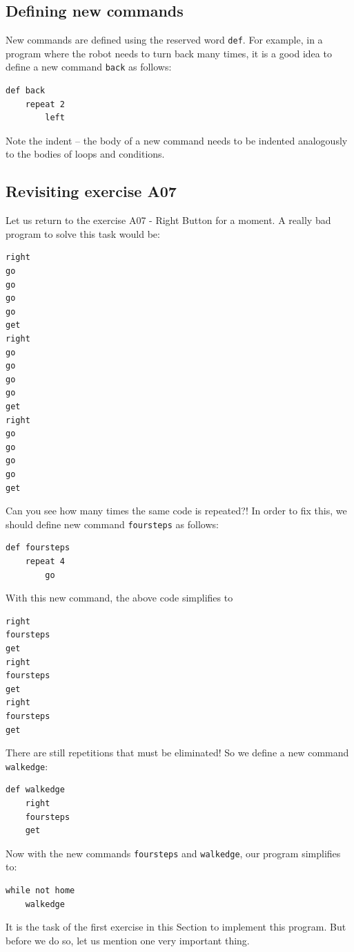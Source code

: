 \subsection{Defining new commands}

New commands are defined using the reserved word 
{\tt def}. For example, in a program where the robot needs to turn back
many times, it is a good idea to define a new command {\tt back}
as follows:

\begin{verbatim}
def back
    repeat 2
        left
\end{verbatim}
Note the indent -- the body of a new command needs to be indented 
analogously to the bodies of loops and conditions.

\subsection{Revisiting exercise A07}

Let us return to the exercise A07 - Right Button for a moment.
A really bad program to solve this task would be:

{\small
\begin{verbatim}
right
go
go
go
go 
get
right
go
go
go
go 
get
right
go
go
go
go
get
\end{verbatim}
}
\noindent
Can you see how many times the same code is repeated?! In order to fix this, 
we should define new command {\tt foursteps} as
follows:

{\small
\begin{verbatim}
def foursteps
    repeat 4
        go
\end{verbatim}
}
\noindent
With this new command, the above code simplifies to 

{\small
\begin{verbatim}
right
foursteps
get
right
foursteps
get
right
foursteps
get
\end{verbatim}
}
\noindent
There are still repetitions that must be eliminated! So we define a new command 
{\tt walkedge}:

{\small
\begin{verbatim}
def walkedge
    right
    foursteps
    get
\end{verbatim}
}
\noindent
Now with the new commands {\tt foursteps} and
{\tt walkedge}, our program simplifies to:

{\small
\begin{verbatim}
while not home
    walkedge
\end{verbatim}
}
\noindent
It is the task of the first exercise in this Section to implement this program. But before we 
do so, let us mention one very important thing.

